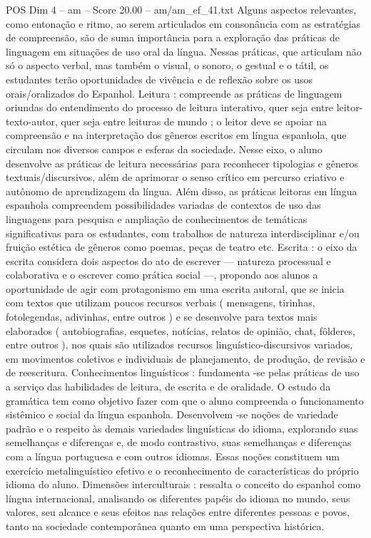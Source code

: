 \begin{textsample}{POS Dim 4 – am – Score 20.00 – am/am\_ef\_41.txt}
Alguns aspectos relevantes, como entonação e ritmo, ao serem articulados em consonância com as estratégias de compreensão, são de suma importância para a exploração das práticas de linguagem em situações de uso oral da língua.
Nessas práticas, que articulam não só o aspecto verbal, mas também o visual, o sonoro, o gestual e o tátil, os estudantes terão oportunidades de vivência e de reflexão sobre os usos orais/oralizados do Espanhol.
Leitura : compreende as práticas de linguagem oriundas do entendimento do processo de leitura interativo, quer seja entre leitor-texto-autor, quer seja entre leituras de mundo ; o leitor deve se apoiar na compreensão e na interpretação dos gêneros escritos em língua espanhola, que circulam nos diversos campos e esferas da sociedade.
Nesse eixo, o aluno desenvolve as práticas de leitura necessárias para reconhecer tipologias e gêneros textuais/discursivos, além de aprimorar o senso crítico em percurso criativo e autônomo de aprendizagem da língua.
Além disso, as práticas leitoras em língua espanhola compreendem possibilidades variadas de contextos de uso das linguagens para pesquisa e ampliação de conhecimentos de temáticas significativas para os estudantes, com trabalhos de natureza interdisciplinar e/ou fruição estética de gêneros como poemas, peças de teatro etc.
Escrita : o eixo da escrita considera dois aspectos do ato de escrever — natureza processual e colaborativa e o escrever como prática social —, propondo aos alunos a oportunidade de agir com protagonismo em uma escrita autoral, que se inicia com textos que utilizam poucos recursos verbais ( mensagens, tirinhas, fotolegendas, adivinhas, entre outros ) e se desenvolve para textos mais elaborados ( autobiografias, esquetes, notícias, relatos de opinião, chat, fôlderes, entre outros ), nos quais são utilizados recursos linguístico-discursivos variados, em movimentos coletivos e individuais de planejamento, de produção, de revisão e de reescritura.
Conhecimentos linguísticos : fundamenta -se pelas práticas de uso a serviço das habilidades de leitura, de escrita e de oralidade.
O estudo da gramática tem como objetivo fazer com que o aluno compreenda o funcionamento sistêmico e social da língua espanhola.
Desenvolvem -se noções de variedade padrão e o respeito às demais variedades linguísticas do idioma, explorando suas semelhanças e diferenças e, de modo contrastivo, suas semelhanças e diferenças com a língua portuguesa e com outros idiomas.
Essas noções constituem um exercício metalinguístico efetivo e o reconhecimento de características do próprio idioma do aluno.
Dimensões interculturais : ressalta o conceito do espanhol como língua internacional, analisando os diferentes papéis do idioma no mundo, seus valores, seu alcance e seus efeitos nas relações entre diferentes pessoas e povos, tanto na sociedade contemporânea quanto em uma perspectiva histórica.

\end{textsample}

